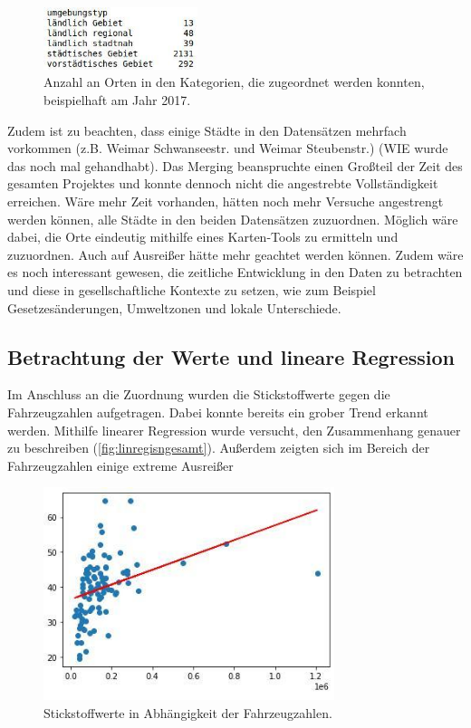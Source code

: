 \documentclass[11pt,a4paper,oneside,german]{article}
\begin{document}
\begin{figure}[h!]
	\centering
	\includegraphics[width=4.5cm]{Kategorien.jpg}
	\caption{Anzahl an Orten in den Kategorien, die zugeordnet werden konnten, beispielhaft am Jahr 2017.}
	\label{fig:Kategorien}
\end{figure}

Zudem ist zu beachten, dass einige Städte in den Datensätzen mehrfach vorkommen (z.B. Weimar Schwanseestr. und Weimar Steubenstr.) (WIE wurde das noch mal gehandhabt). Das Merging beanspruchte einen Großteil der Zeit des gesamten Projektes und konnte dennoch nicht die angestrebte Vollständigkeit erreichen. Wäre mehr Zeit vorhanden, hätten noch mehr Versuche angestrengt werden können, alle Städte in den beiden Datensätzen zuzuordnen. Möglich wäre dabei, die Orte eindeutig mithilfe eines Karten-Tools zu ermitteln und zuzuordnen. Auch auf Ausreißer hätte mehr geachtet werden können. Zudem wäre es noch interessant gewesen, die zeitliche Entwicklung in den Daten zu betrachten und diese in gesellschaftliche Kontexte zu setzen, wie zum Beispiel Gesetzesänderungen, Umweltzonen und lokale Unterschiede.

\subsection{Betrachtung der Werte und lineare Regression}

Im Anschluss an die Zuordnung wurden die Stickstoffwerte gegen die Fahrzeugzahlen aufgetragen. Dabei konnte bereits ein grober Trend erkannt werden. Mithilfe linearer Regression wurde versucht, den Zusammenhang genauer zu beschreiben (\ref{fig:linregisngesamt}). Außerdem zeigten sich im Bereich der Fahrzeugzahlen einige extreme Ausreißer

\begin{figure}[h!]
	\centering
	\includegraphics[width=8.5cm]{linreginsgesamt.jpg}
	\caption{Stickstoffwerte in Abhängigkeit der Fahrzeugzahlen.}
	\label{fig:linreginsgesamt}
\end{figure}
\end{document}
